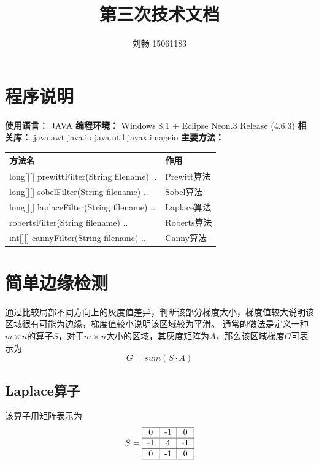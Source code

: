 \documentclass[UTF8]{ctexart}
\title{第三次技术文档}
\author{刘畅 15061183}
\begin{document}
\maketitle
\section{程序说明}
\noindent
\textbf{使用语言：} JAVA \newline
\textbf{编程环境：} Windows 8.1 + Eclipse Neon.3 Release (4.6.3) \newline
\textbf{相关库：}\newline
\indent java.awt\newline
\indent java.io\newline
\indent java.util\newline
\indent javax.imageio\newline
\textbf{主要方法：} \newline
\begin{tabular}{p{10cm}p{7cm}}
\hline
\textbf{方法名}& \textbf{作用} \\
\hline
long[][] prewittFilter(String filename) {..}&  Prewitt算法\\
\hline
long[][] sobelFilter(String filename) {..}&  Sobel算法\\
\hline
long[][] laplaceFilter(String filename) {..}&  Laplace算法\\
\hline
robertsFilter(String filename) {..}& Roberts算法\\
\hline
int[][] cannyFilter(String filename) {..}& Canny算法\\
\hline
\end{tabular}

\section{简单边缘检测}
通过比较局部不同方向上的灰度值差异，判断该部分梯度大小，梯度值较大说明该区域很有可能为边缘，梯度值较小说明该区域较为平滑。
通常的做法是定义一种$m×n$的算子$S$，对于$m×n$大小的区域，其灰度矩阵为$A$，那么该区域梯度$G$可表示为
\[
G = sum(S \cdot A)
\]

\subsection{Laplace算子}
该算子用矩阵表示为
\[
S = 
\begin{tabular}{|c|c|c|}
\hline
0 & -1 & 0 \\
\hline
-1 & 4 & -1 \\
\hline
0 & -1 & 0 \\
\hline
\end{tabular}
\]
\end{document}
